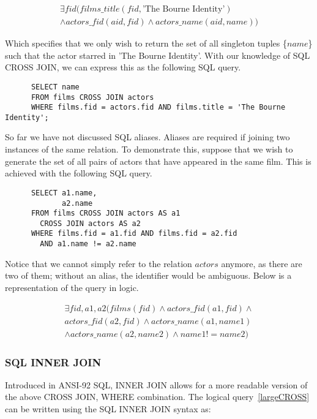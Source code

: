 \documentclass[a4paper, 11pt]{article}
\begin{document}
      \begin{gather}
        \exists fid(films\_title(fid, \text{'The Bourne Identity'}) \\
        \land actors\_fid(aid, fid) \land actors\_name(aid, name))
      \end{gather}

      Which specifies that we only wish to return the set of all singleton
      tuples \{$name$\} such that the actor starred in 'The Bourne Identity'.
      With our knowledge of SQL CROSS JOIN, we can express this as the
      following SQL query.

      \begin{verbatim}
      SELECT name
      FROM films CROSS JOIN actors
      WHERE films.fid = actors.fid AND films.title = 'The Bourne Identity';
      \end{verbatim}

      So far we have not discussed SQL aliases. Aliases are required if joining
      two instances of the same relation. To demonstrate this, suppose that we
      wish to generate the set of all pairs of actors that have appeared in the
      same film. This is achieved with the following SQL query.

      \begin{verbatim}
      SELECT a1.name,
             a2.name
      FROM films CROSS JOIN actors AS a1
        CROSS JOIN actors AS a2
      WHERE films.fid = a1.fid AND films.fid = a2.fid 
        AND a1.name != a2.name
      \end{verbatim}

      Notice that we cannot simply refer to the relation $actors$ anymore, as
      there are two of them; without an alias, the identifier would be
      ambiguous. Below is a representation of the query in logic.

      \begin{multline}
        \exists fid, a1, a2(films(fid) \land actors\_fid(a1, fid) \land \\
        actors\_fid(a2, fid) \land actors\_name(a1, name1)\\
        \land actors\_name(a2, name2) \land name1 != name2) \label{largeCROSS}
      \end{multline}

    \subsubsection{SQL INNER JOIN}

      Introduced in ANSI-92 SQL, INNER JOIN allows for a more readable version of
      the above CROSS JOIN, WHERE combination. The logical query~\ref{largeCROSS}
      can be written using the SQL INNER JOIN syntax as:
\end{document}
